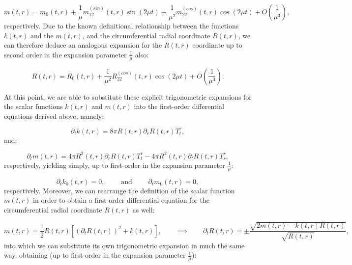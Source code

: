 \documentclass{article}
\begin{document}
\begin{equation}
m \left( t, r \right) = m_0 \left( t, r \right) + \frac{1}{\mu} m_{1 2}^{\left( sin \right)} \left( t, r \right) \sin \left( 2 \mu t \right) + \frac{1}{\mu^2} m_{2 2}^{\left( cos \right)} \left( t, r \right) \cos \left( 2 \mu t \right) + O \left( \frac{1}{\mu^3} \right),
\end{equation}
respectively. Due to the known definitional relationship between the functions ${k \left( t, r \right)}$ and the ${m \left( t, r \right)}$, and the circumferential radial coordinate ${R \left( t, r \right)}$, we can therefore deduce an analogous expansion for the ${R \left( t, r \right)}$ coordinate up to second order in the expansion parameter ${\frac{1}{\mu}}$ also:

\begin{equation}
R \left( t, r \right) = R_0 \left( t, r \right) + \frac{1}{\mu^2} R_{2 2}^{\left( cos \right)} \left( t, r \right) \cos \left( 2 \mu t \right) + O \left( \frac{1}{\mu^3} \right).
\end{equation}

At this point, we are able to substitute these explicit trigonometric expansions for the scalar functions ${k \left( t, r \right)}$ and ${m \left( t, r \right)}$ into the first-order differential equations derived above, namely:

\begin{equation}
\partial_t k \left( t, r \right) = 8 \pi R \left( t, r \right) \partial_r R \left( t, r \right) T_{t}^{r},
\end{equation}
and:

\begin{equation}
\partial_t m \left( t, r \right) = 4 \pi R^2 \left( t, r \right) \partial_r R \left( t, r \right) T_{t}^{r} - 4 \pi R^2 \left( t, r \right) \partial_t R \left( t, r \right) T_{r}^{r},
\end{equation}
respectively, yielding simply, up to first-order in the expansion parameter ${\frac{1}{\mu}}$:

\begin{equation}
\partial_t k_0 \left( t, r \right) = 0, \qquad \text{ and } \qquad \partial_t m_0 \left( t, r \right) = 0,
\end{equation}
respectively. Moreover, we can rearrange the definition of the scalar function ${m \left( t, r \right)}$ in order to obtain a first-order differential equation for the circumferential radial coordinate ${R \left( t, r \right)}$ as well:

\begin{equation}
m \left( t, r \right) = \frac{1}{2} R \left( t, r \right) \left[ \left( \partial_t R \left( t, r \right) \right)^2 + k \left( t, r \right) \right], \qquad \implies \qquad \partial_t R \left( t, r \right) = \pm \frac{\sqrt{2 m \left( t, r \right) - k \left( t, r \right) R \left( t, r \right)}}{\sqrt{R \left( t, r \right)}},
\end{equation}
into which we can substitute its own trigonometric expansion in much the same way, obtaining (up to first-order in the expansion parameter ${\frac{1}{\mu}}$):
\end{document}
